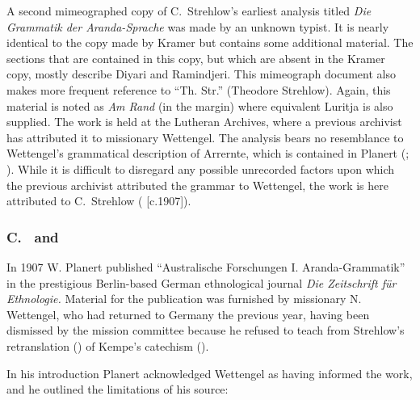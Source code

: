 A second mimeographed copy of C.~Strehlow’s earliest analysis titled \textit{Die Grammatik der Aranda-Sprache} was made by an unknown typist. It is nearly identical to the copy made by Kramer but contains some additional material. The sections that are contained in this copy, but which are absent in the Kramer copy, mostly describe Diyari and Ramindjeri. This mimeograph document also makes more frequent reference to “Th. Str.” (Theodore Strehlow). Again, this material is noted as \textit{Am Rand} (in the margin) where equivalent Luritja is also supplied. The work is held at the Lutheran Archives, where a previous archivist has attributed it to missionary Wettengel. The analysis bears no resemblance to Wettengel’s grammatical description of Arrernte, which is contained in Planert (\citeyear{planert_australische_1907}; ). While it is difficult to disregard any possible unrecorded factors upon which the previous archivist attributed the grammar to Wettengel, the work is here attributed to C.~Strehlow (\citeyear{strehlow_grammatik_1931} [c.1907]).

\subsubsection{C.~\citet{strehlow_einige_1908} and \citet{planert_australische_1907}}
\label{sec:key:9.2.3.2}\label{bkm:Ref464826218}

In 1907 W. Planert published “Australische Forschungen I. Aranda-Grammatik” in the prestigious Berlin-based German ethnological journal \textit{Die Zeitschrift für Ethnologie.} Material for the publication was furnished by missionary N. Wettengel, who had returned to Germany the previous year, having been dismissed by the mission committee because he refused to teach from Strehlow’s retranslation (\citeyear{strehlow_letter_1904}) of Kempe’s catechism (\citeyear{kempe_grammar_1891}).

In his introduction Planert acknowledged Wettengel as having informed the work, and he outlined the limitations of his source:

